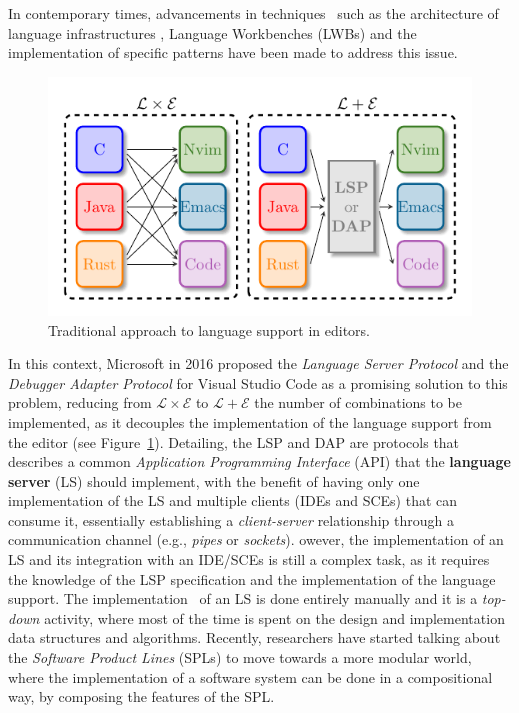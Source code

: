 In contemporary times, advancements in techniques~\cite{Rask21a} such as the architecture of language infrastructures \cite{Lammel18, Voelter13}, Language Workbenches (LWBs) \cite{Erdweg13b} and the implementation of specific patterns \cite{Basten15, Mernik05, Parr09} have been made to address this issue.
\hfill \break
\begin{figure}[t]
    \centering
    \includegraphics[width=0.75\linewidth]{figs/lsp_combinations.pdf}
    \caption{Traditional approach to language support in editors.}
    \label{fig:traditional}
\end{figure}
In this context, Microsoft in 2016 proposed the \textit{Language Server Protocol} and the \textit{Debugger Adapter Protocol} for Visual Studio Code as a promising solution to this problem, reducing from $\mathcal{L} \times \mathcal{E}$ to $\mathcal{L} + \mathcal{E}$ the number of combinations to be implemented, as it decouples the implementation of the language support from the editor (see Figure~\ref{fig:traditional}).
Detailing, the LSP and DAP are protocols that describes a common \textit{Application Programming Interface} (API) that the \textbf{language server} (LS) should implement, with the benefit of having only one implementation of the LS and multiple clients (IDEs and SCEs) that can consume it, essentially establishing a \textit{client-server} relationship through a communication channel (e.g., \textit{pipes} or \textit{sockets}).
owever, the implementation of an LS and its integration with an IDE/SCEs is still a complex task, as it requires the knowledge of the LSP specification and the implementation of the language support.
The implementation~\cite{Gunasinghe22} of an LS is done entirely manually and it is a \textit{top-down} activity, where most of the time is spent on the design and implementation data structures and algorithms.
Recently, researchers have started talking about the \textit{Software Product Lines} (SPLs) \cite{Cazzola23d, Cazzola20} to move towards a more modular world, where the implementation of a software system can be done in a compositional way, by composing the features of the SPL.
